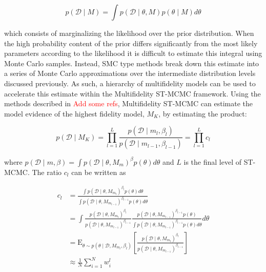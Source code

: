 \documentclass[1p]{article}
\begin{document}
\begin{equation}
p \left ( \mathcal{D} \mid M \right ) = \int p \left ( \mathcal{D} \mid \theta, M \right ) p \left ( \theta \mid M\right ) d\theta
\end{equation}

which consists of marginalizing the likelihood over the prior distribution. When the high probability content of the prior differs significantly from the most likely parameters according to the likelihood it is difficult to estimate this integral using Monte Carlo samples.  Instead, SMC type methods break down this estimate into a series of Monte Carlo approximations over the intermediate distribution levels discussed previously.  As such, a hierarchy of multifidelity models can be used to accelerate this estimate within the Multifidelity ST-MCMC framework. Using the methods described in \textcolor{red}{Add some refs}, Multifidelity ST-MCMC can estimate the model evidence of the highest fidelity model, $M_K$, by estimating the product:

\begin{equation}
p \left ( \mathcal{D} \mid M_K \right ) = \prod_{l = 1}^L \frac{ p \left (\mathcal{D} \mid m_l, \beta_l \right ) }{ p \left (\mathcal{D} \mid m_{l-1}, \beta_{l-1} \right ) } =  \prod_{l = 1}^L c_l
\end{equation}

where $p \left (\mathcal{D} \mid m, \beta \right ) = \int p \left ( \mathcal{D} \mid \theta, M_{m} \right )^{\beta} p \left ( \theta \right ) d\theta$ and $L$ is the final level of ST-MCMC. The ratio $c_l$ can be written as

\begin{equation}
\begin{split}
c_l &= \frac{\int p \left ( \mathcal{D} \mid \theta, M_{m_l} \right )^{\beta_l} p \left ( \theta \right ) d\theta}{\int p \left ( \mathcal{D} \mid \theta, M_{m_{l-1}} \right )^{\beta_{l-1}} p \left ( \theta \right ) d\theta}\\
&= \int \frac{p \left ( \mathcal{D} \mid \theta, M_{m_l} \right )^{\beta_l}}{p \left ( \mathcal{D} \mid \theta, M_{m_{l-1}} \right )^{\beta_{l-1}}} \frac{p \left ( \mathcal{D} \mid \theta, M_{m_{l-1}} \right )^{\beta_{l-1}} p \left ( \theta \right )}{\int p \left ( \mathcal{D} \mid \theta, M_{m_{l-1}} \right )^{\beta_{l-1}} p \left ( \theta \right ) d\theta} d\theta\\
&=  \text{E}_{\theta \sim p \left (\theta \mid \mathcal{D}, M_{m_l}, \beta_l \right )} \left [ \frac{p \left ( \mathcal{D} \mid \theta, M_{m_l} \right )^{\beta_l}}{p \left ( \mathcal{D} \mid \theta, M_{m_{l-1}} \right )^{\beta_{l-1}}} \right ]\\
&\approx \frac{1}{N} \sum_{i=1}^N w_i^l
\end{split}
\end{equation}
\end{document}
